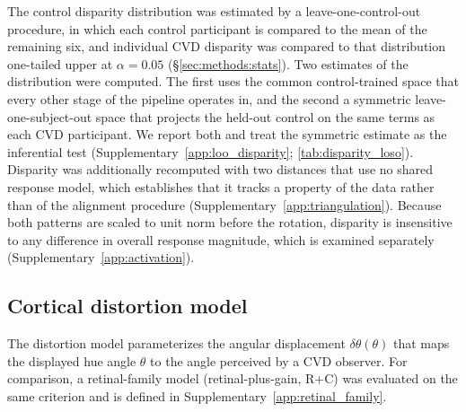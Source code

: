 The control disparity distribution was estimated by a leave-one-control-out procedure, in which each control participant is compared to the mean of the remaining six, and individual CVD disparity was compared to that distribution one-tailed upper at $\alpha = 0.05$ (\S\ref{sec:methods:stats}). Two estimates of the distribution were computed. The first uses the common control-trained space that every other stage of the pipeline operates in, and the second a symmetric leave-one-subject-out space that projects the held-out control on the same terms as each CVD participant. We report both and treat the symmetric estimate as the inferential test (Supplementary~\cref{app:loo_disparity}; \cref{tab:disparity_loso}). Disparity was additionally recomputed with two distances that use no shared response model, which establishes that it tracks a property of the data rather than of the alignment procedure (Supplementary~\cref{app:triangulation}).
 Because both patterns are scaled to unit norm before the rotation, disparity is insensitive to any difference in overall response magnitude, which is examined separately (Supplementary~\cref{app:activation}).

\subsection{Cortical distortion model}
\label{sec:methods:candidates}

The distortion model parameterizes the angular displacement $\delta\theta(\theta)$ that maps the displayed hue angle $\theta$ to the angle perceived by a CVD observer. For comparison, a retinal-family model (retinal-plus-gain, R+C) was evaluated on the same criterion and is defined in Supplementary~\cref{app:retinal_family}.

